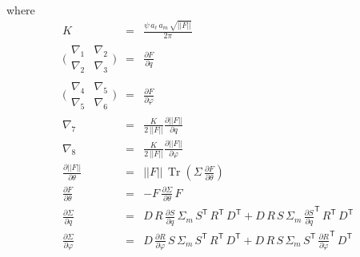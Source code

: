 \documentclass[modern]{aastex62}
\newcommand{\transpose}[1]{{#1}^{\!\mathsf T}}
\renewcommand{\det}[1]{||{#1}||}
\DeclareMathOperator{\trace}{Tr}
\begin{document}
{where
\begin{eqnarray}
K & = & \frac{\psi \, a_\ell \, a_m \, \sqrt{\det{F}}}{2\pi} \nonumber \\
\bigl(
  \begin{smallmatrix}
    {\nabla_1} & {\nabla_2} \\
    {\nabla_2} & {\nabla_3}
  \end{smallmatrix}
\bigr)
  & = & \frac{\partial F}{\partial q} \nonumber \\
\bigl(
  \begin{smallmatrix}
    {\nabla_4} & {\nabla_5} \\
    {\nabla_5} & {\nabla_6}
  \end{smallmatrix}
\bigr)
  & = & \frac{\partial F}{\partial \varphi} \nonumber \\
\nabla_7 & = & \frac{ K }{2 \, \det{F}}\frac{\partial\det{F}}{\partial q} \nonumber \\
\nabla_8 & = & \frac{ K }{2 \, \det{F}}\frac{\partial\det{F}}{\partial \varphi} \nonumber \\
\frac{\partial \det{F}}{\partial \theta} & = & \det{F}\, \trace(\Sigma \, \frac{\partial F}{\partial\theta}) \nonumber \\
\frac{\partial F}{\partial \theta} & = & -F\, \frac{\partial \Sigma}{\partial \theta} \, F \nonumber \\
\frac{\partial \Sigma}{\partial q} & = & D\, R\, \frac{\partial S}{\partial q} \, \Sigma_m \, \transpose{S} \, \transpose{R} \, \transpose{D} + D\, R\, S \, \Sigma_m \, \transpose{\frac{\partial S}{\partial q}} \, \transpose{R} \, \transpose{D} \nonumber \\
\frac{\partial \Sigma}{\partial \varphi} & = & D\, \frac{\partial R}{\partial \varphi} \, S\, \Sigma_m \, \transpose{S} \, \transpose{R} \, \transpose{D} +  D\, R\, S \, \Sigma_m \, \transpose{S} \, \transpose{\frac{\partial R}{\partial \varphi}} \, \transpose{D} \nonumber \\
\end{eqnarray}


}
\end{document}
